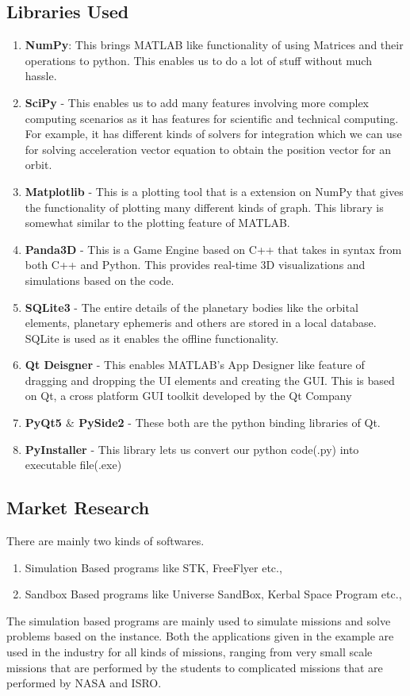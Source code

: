 \subsection{Libraries Used}
\begin{enumerate}
\item \textbf{NumPy}:  This brings MATLAB like functionality of using Matrices and their operations to python. This enables us to do a lot of stuff without much hassle.
\item \textbf{SciPy} - This enables us to add many features involving more complex computing scenarios as it has features for scientific and technical computing. For example, it has different kinds of solvers for integration which we can use for solving acceleration vector equation to obtain the position vector for an orbit.
\item \textbf{Matplotlib} - This is a plotting tool that is a extension on NumPy that gives the functionality of plotting many different kinds of graph. This library is somewhat similar to the plotting feature of MATLAB.
\item \textbf{Panda3D} - This is a Game Engine based on C++ that takes in syntax from both C++ and Python. This provides real-time 3D visualizations and simulations based on the code.
\item \textbf{SQLite3} - The entire details of the planetary bodies like the orbital elements, planetary ephemeris and others are stored in a local database. SQLite is used as it enables the offline functionality.
\item \textbf{Qt Deisgner} - This enables MATLAB's App Designer like feature of dragging and dropping the UI elements and creating the GUI. This is based on Qt, a cross platform GUI toolkit developed by the Qt Company
\item \textbf{PyQt5 $\&$ PySide2} - These both are the python binding libraries of Qt.
\item \textbf{PyInstaller} - This library lets us convert our python code(.py) into executable file(.exe)
\end{enumerate}
\subsection{Market Research}
There are mainly two kinds of softwares.
\begin{enumerate}
\item Simulation Based programs like STK, FreeFlyer etc.,
\item Sandbox Based programs like Universe SandBox, Kerbal Space Program etc.,
\end{enumerate}
\hspace{2em}The simulation based programs are mainly used to simulate missions and solve problems based on the instance. Both the applications given in the example are used in the industry for all kinds of missions, ranging from very small scale missions that are performed by the students to complicated missions that are performed by NASA and ISRO.


